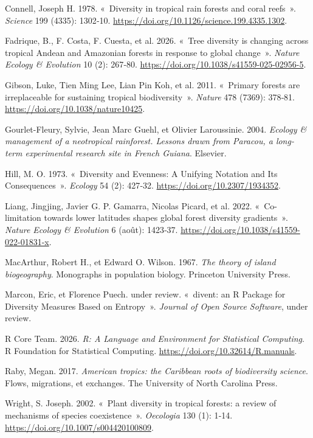 \documentclass[
  french,
  11pt,
]{stylisharticle}
\newlength{\cslhangindent}
\newenvironment{CSLReferences}[2] %
 {\begin{list}{}{%
  \setlength{\itemindent}{0pt}
  \setlength{\leftmargin}{0pt}
  \setlength{\parsep}{0pt}
  \ifodd #1
   \setlength{\leftmargin}{\cslhangindent}
   \setlength{\itemindent}{-1\cslhangindent}
  \fi
  \setlength{\itemsep}{#2\baselineskip}}}
 {\end{list}}
\begin{document}
\protect{}\label{refs}
\begin{CSLReferences}{1}{1}
Connell, Joseph H. 1978. {«~Diversity in tropical rain forests and coral
reefs~»}. \emph{Science} 199 (4335): 1302‑10.
\url{https://doi.org/10.1126/science.199.4335.1302}.

{Fadrique, B., F. Costa, F. Cuesta, et al.} 2026. {«~Tree diversity is
changing across tropical Andean and Amazonian forests in response to
global change~»}. \emph{Nature Ecology \& Evolution} 10 (2): 267‑80.
\url{https://doi.org/10.1038/s41559-025-02956-5}.

{Gibson, Luke, Tien Ming Lee, Lian Pin Koh, et al.} 2011. {«~Primary
forests are irreplaceable for sustaining tropical biodiversity~»}.
\emph{Nature} 478 (7369): 378‑81.
\url{https://doi.org/10.1038/nature10425}.

Gourlet-Fleury, Sylvie, Jean Marc Guehl, et Olivier Laroussinie. 2004.
\emph{Ecology \& management of a neotropical rainforest. Lessons drawn
from Paracou, a long-term experimental research site in French Guiana}.
Elsevier.

Hill, M. O. 1973. {«~Diversity and Evenness: A Unifying Notation and Its
Consequences~»}. \emph{Ecology} 54 (2): 427‑32.
\url{https://doi.org/10.2307/1934352}.

{Liang, Jingjing, Javier G. P. Gamarra, Nicolas Picard, et al.} 2022.
{«~Co-limitation towards lower latitudes shapes global forest diversity
gradients~»}. \emph{Nature Ecology \& Evolution} 6 (août): 1423‑37.
\url{https://doi.org/10.1038/s41559-022-01831-x}.

MacArthur, Robert H., et Edward O. Wilson. 1967. \emph{The theory of
island biogeography}. Monographs in population biology. Princeton
University Press.

Marcon, Eric, et Florence Puech. under review. {«~divent: an {R} Package
for Diversity Measures Based on Entropy~»}. \emph{Journal of Open Source
Software}, under review.

R Core Team. 2026. \emph{R: A Language and Environment for Statistical
Computing}. R Foundation for Statistical Computing.
\url{https://doi.org/10.32614/R.manuals}.

Raby, Megan. 2017. \emph{American tropics: the Caribbean roots of
biodiversity science}. Flows, migrations, et exchanges. The University
of North Carolina Press.

Wright, S. Joseph. 2002. {«~Plant diversity in tropical forests: a
review of mechanisms of species coexistence~»}. \emph{Oecologia} 130
(1): 1‑14. \url{https://doi.org/10.1007/s004420100809}.

\end{CSLReferences}
\end{document}
